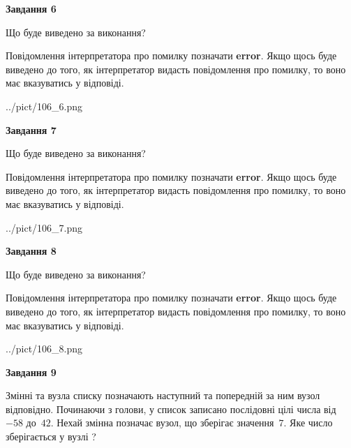 \documentclass[12pt, ukrainian]{article}
\begin{document}
{\begin {large}
{\begin {center}\textbf{Завдання 6}\end {center}}\par
Що буде виведено за виконання?

Повідомлення інтерпретатора про помилку позначати \textbf{error}.
Якщо щось буде виведено до того, як інтерпретатор видасть повідомлення про помилку, 
то воно має вказуватись у відповіді. \par


\begin{center}
	{../pict/106_6.png}
\end{center}
\newpage

{\begin {center}\textbf{Завдання 7}\end {center}}\par
Що буде виведено за виконання?

Повідомлення інтерпретатора про помилку позначати \textbf{error}.
Якщо щось буде виведено до того, як інтерпретатор видасть повідомлення про помилку, 
то воно має вказуватись у відповіді. \par


\begin{center}
	{../pict/106_7.png}
\end{center}
\newpage

{\begin {center}\textbf{Завдання 8}\end {center}}\par
Що буде виведено за виконання?

Повідомлення інтерпретатора про помилку позначати \textbf{error}.
Якщо щось буде виведено до того, як інтерпретатор видасть повідомлення про помилку, 
то воно має вказуватись у відповіді. \par


\begin{center}
	{../pict/106_8.png}
\end{center}
\newpage

{\begin {center}\textbf{Завдання 9}\end {center}}\par
Змінні  та  вузла списку позначають наступний та попередній за ним вузол відповідно. Починаючи з голови, у список записано послідовні цілі числа від~$-58$ до~$42$. Нехай змінна  позначає вузол, що зберігає значення~$7$.
Яке число зберігається у вузлі  ?\par
\newpage


\end{large}}
\end{document}

